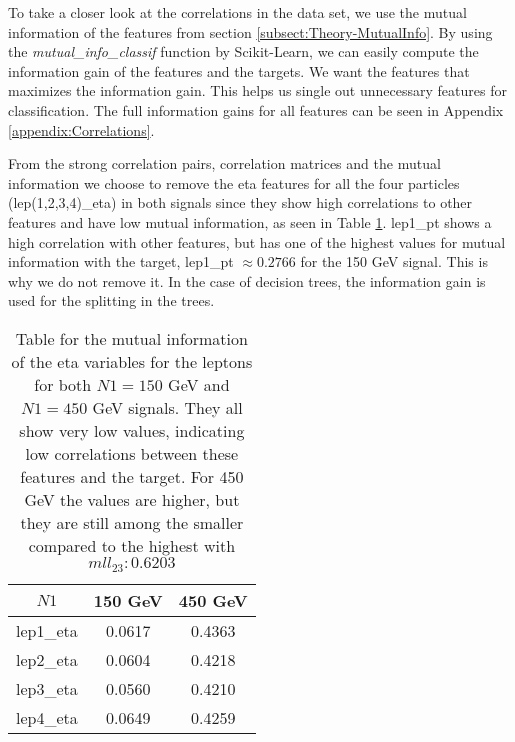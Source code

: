 \documentclass[a4paper, american, 12pt]{report}
\begin{document}
	To take a closer look at the correlations in the data set, we use the mutual information of the features from section \ref{subsect:Theory-MutualInfo}. By using the \textit{mutual\_info\_classif} function by Scikit-Learn, we can easily compute the information gain of the features and the targets. We want the features that maximizes the information gain. This helps us single out unnecessary features for classification. The full information gains for all features can be seen in Appendix \ref{appendix:Correlations}.
	
	From the strong correlation pairs, correlation matrices and the mutual information we choose to remove the eta features for all the four particles (lep(1,2,3,4)\_eta) in both signals since they show high correlations to other features and have low mutual information, as seen in Table \ref{tab:MutualInfo_eta}. lep1\_pt shows a high correlation with other features, but has one of the highest values for mutual information with the target, lep1\_pt $\approx 0.2766$ for the 150 GeV signal. This is why we do not remove it. In the case of decision trees, the information gain is used for the splitting in the trees.
	\begin{table}[htbp!]
		\centering
		\begin{tabular}{ |c|c|c| }
			\hline \rule{0pt}{13pt}
			$N1$ & 150 GeV  & 450 GeV   \\
			\hline \rule{0pt}{13pt}
			lep1\_eta & 0.0617 & 0.4363 \\
			\hline \rule{0pt}{13pt}
			lep2\_eta & 0.0604 & 0.4218  \\
			\hline \rule{0pt}{13pt}
			lep3\_eta & 0.0560 & 0.4210 \\
			\hline \rule{0pt}{13pt}
			lep4\_eta & 0.0649 & 0.4259 \\
			\hline
		\end{tabular}	
		\caption[Mutual information for eta-values.]{Table for the mutual information of the eta variables for the leptons for both $N1=150$ GeV and $N1=450$ GeV signals. They all show very low values, indicating low correlations between these features and the target. For 450 GeV the values are higher, but they are still among the smaller compared to the highest with $mll_{23}:0.6203$}
		\label{tab:MutualInfo_eta}
	\end{table}
	
	
\end{document}
